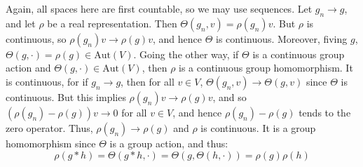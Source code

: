 \documentclass{article}                                                        %
\begin{document}
        \begin{solution}
            Again, all spaces here are first countable, so we may use sequences.
            Let $g_{n}\rightarrow{g}$, and let $\rho$ be a real representation.
            Then $\Theta(g_{n},v)=\rho(g_{n})v$. But $\rho$ is continuous, so
            $\rho(g_{n})v\rightarrow\rho(g)v$, and hence $\Theta$ is continuous.
            Moreover, fiving $g$, $\Theta(g,\cdot)=\rho(g)\in\textrm{Aut}(V)$.
            Going the other way, if $\Theta$ is a continuous group action and
            $\Theta(g,\cdot)\in\textrm{Aut}(V)$, then $\rho$ is a continuous
            group homomorphism. It is continuous, for if $g_{n}\rightarrow{g}$,
            then for all $v\in{V}$, $\Theta(g_{n},v)\rightarrow\Theta(g,v)$
            since $\Theta$ is continuous. But this implies
            $\rho(g_{n})v\rightarrow\rho(g)v$, and so
            $(\rho(g_{n})-\rho(g))v\rightarrow{0}$ for all $v\in{V}$, and hence
            $\rho(g_{n})-\rho(g)$ tends to the zero operator. Thus,
            $\rho(g_{n})\rightarrow\rho(g)$ and $\rho$ is continuous. It is a
            group homomorphism since $\Theta$ is a group action, and thus:
            \begin{equation}
                \rho(g*h)=\Theta(g*h,\cdot)
                =\Theta(g,\Theta(h,\cdot))=\rho(g)\rho(h)
            \end{equation}
        \end{solution}
\end{document}
